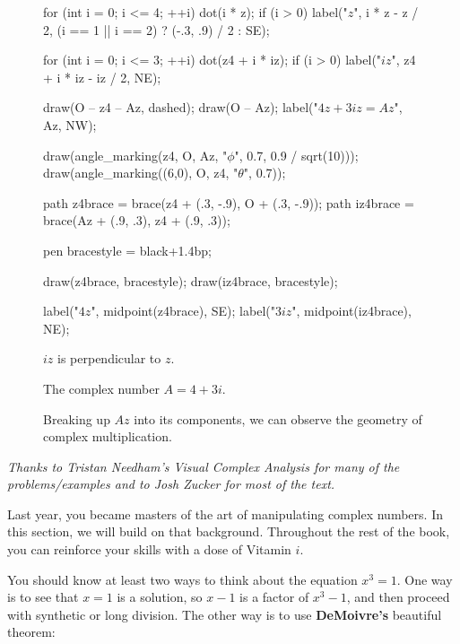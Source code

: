 \documentclass[../gatm.tex]{subfiles}
\begin{document}
\begin{figure}[h]
\begin{minipage}[b]{0.3\textwidth}
\begin{asy}[width=\textwidth]
		for (int i = 0; i <= 4; ++i) {
		dot(i * z);
		if (i > 0) label("$z$", i * z - z / 2, (i == 1 || i == 2) ? (-.3, .9) / 2 : SE);
		}
		
		for (int i = 0; i <= 3; ++i) {
		dot(z4 + i * iz);
		if (i > 0) label("$iz$", z4 + i * iz - iz / 2, NE);
		}
		
		draw(O -- z4 -- Az, dashed);
		draw(O -- Az);
		label("$4z + 3iz = Az$", Az, NW);
		
		draw(angle_marking(z4, O, Az, "$\phi$", 0.7, 0.9 / sqrt(10)));
		draw(angle_marking((6,0), O, z4, "$\theta$", 0.7));
		
		path z4brace = brace(z4 + (.3, -.9), O + (.3, -.9));
		path iz4brace = brace(Az + (.9, .3), z4 + (.9, .3));
		
		pen bracestyle = black+1.4bp;
		
		draw(z4brace, bracestyle);
		draw(iz4brace, bracestyle);
		
		label("$4z$", midpoint(z4brace), SE);
		label("$3iz$", midpoint(iz4brace), NE);
		\end{asy}
	\end{minipage}
	
	\begin{minipage}[t]{0.3\textwidth}
		\caption{$iz$ is perpendicular to $z$.}
		\label{fig:izzperp}
	\end{minipage}\hfill
	\begin{minipage}[t]{0.3\textwidth}
		\caption{The complex number $A=4+3i$.}
		\label{fig:lol}
	\end{minipage}\hfill
	\begin{minipage}[t]{0.3\textwidth}
		\caption{Breaking up $Az$ into its components, we can observe the geometry of complex multiplication.}
	\end{minipage}
\end{figure}

\newcommand{\Arg} {\operatorname{Arg}}
\newcommand{\cis} {\operatorname{cis}}
\newcommand{\Real} {\operatorname{Re}}
\newcommand{\Imag} {\operatorname{Im}}

\noindent\textit{Thanks to Tristan Needham's \emph{Visual Complex Analysis} for many of the problems/examples and to Josh Zucker for most of the text.}

Last year, you became masters of the art of manipulating complex numbers. In this section, we will build on that background. Throughout the rest of the book, you can reinforce your skills with a dose of Vitamin $i$.

You should know at least two ways to think about the equation $x^3 = 1$. One way is to see that $x = 1$ is a solution, so $x - 1$ is a factor of $x^3-1$, and then proceed with synthetic or long division. The other way is to use \textbf{DeMoivre’s} beautiful theorem:
\end{document}
